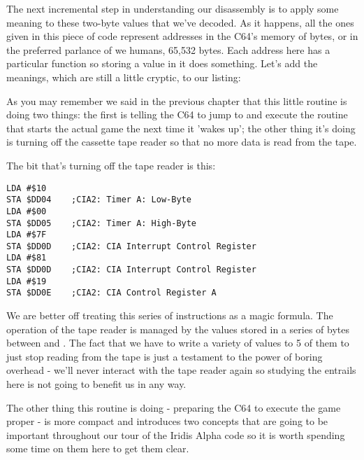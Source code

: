 The next incremental step in understanding our disassembly is to apply some meaning to these two-byte values
that we've decoded. As it happens, all the ones given in this piece of code represent addresses in the C64's
memory of  bytes, or in the preferred parlance of we humans, 65,532 bytes. Each address here
has a particular function so storing a value in it does something. Let's add the meanings, which are still
a little cryptic, to our listing:

\begin{minipage}[b]{0.20\linewidth}
\centering

\end{minipage}
\hspace{0.5cm}
\begin{minipage}[b]{0.70\linewidth}
\centering

\end{minipage}

As you may remember we said in the previous chapter that this little routine is doing two things: the first
is telling the C64 to jump to and execute the routine that starts the actual game the next time it 'wakes up'; the
other thing it's doing is turning off the cassette tape reader so that no more data is read from the tape.

The bit that's turning off the tape reader is this:

\begin{lstlisting}
LDA #$10
STA $DD04    ;CIA2: Timer A: Low-Byte
LDA #$00
STA $DD05    ;CIA2: Timer A: High-Byte
LDA #$7F
STA $DD0D    ;CIA2: CIA Interrupt Control Register
LDA #$81
STA $DD0D    ;CIA2: CIA Interrupt Control Register
LDA #$19
STA $DD0E    ;CIA2: CIA Control Register A
\end{lstlisting}

We are better off treating this series of instructions as a magic formula. The operation of the tape reader
is managed by the values stored in a series of bytes between  and . The fact that
we have to write a variety of values to 5 of them to just stop reading from the tape is just a testament
to the power of boring overhead - we'll never interact with the tape reader again so studying the entrails
here is not going to benefit us in any way.

The other thing this routine is doing - preparing the C64 to execute the game proper - is more compact and
introduces two concepts that are going to be important throughout our tour of the Iridis Alpha code so it
is worth spending some time on them here to get them clear.


